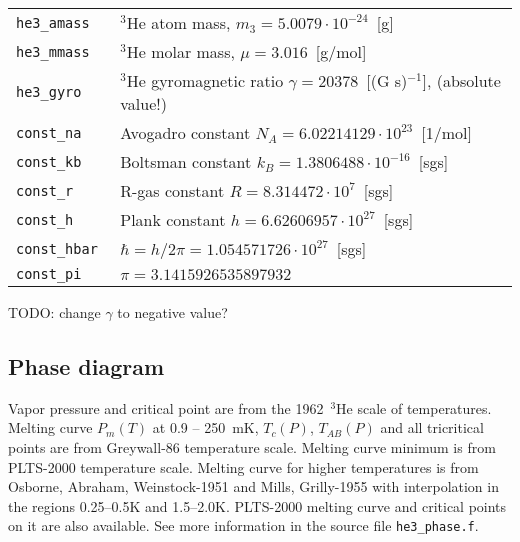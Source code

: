 \documentclass[a4paper]{article}
\begin{document}
\medskip
\noindent\begin{tabular}{lp{11cm}}
\tt he3\_amass     & $^3$He atom mass, $m_3 = 5.0079 \cdot 10^{-24}$~[g]\\
\tt he3\_mmass     & $^3$He molar mass, $\mu = 3.016$~[g/mol]\\
\tt he3\_gyro      & $^3$He gyromagnetic ratio $\gamma = 20378$~[(G s)$^{-1}$],\newline
                     (absolute value!)\\
\tt const\_na      & Avogadro constant $N_A = 6.02214129 \cdot 10^{23}$~[1/mol]\\
\tt const\_kb      & Boltsman constant $k_B = 1.3806488 \cdot 10^{-16}$~[sgs]\\
\tt const\_r       & R-gas constant $R = 8.314472 \cdot 10^{7}$~[sgs]\\
\tt const\_h       & Plank constant $h = 6.62606957 \cdot 10^{27}$~[sgs]\\
\tt const\_hbar    & $\hbar = h/2\pi = 1.054571726 \cdot 10^{27}$~[sgs]\\
\tt const\_pi      & $\pi = 3.1415926535897932$\\
\end{tabular}
\medskip

\noindent TODO: change $\gamma$ to negative value?

\eject
\subsection*{Phase diagram}

Vapor pressure and critical point are from the {1962~$^3$He scale of
temperatures}. Melting curve $P_m(T)$ at 0.9 -- 250~mK, $T_c(P)$,
$T_{AB}(P)$ and all tricritical points are from {Greywall-86 temperature
scale}. Melting curve minimum is from PLTS-2000 temperature scale.
Melting curve for higher temperatures is from {Osborne, Abraham, Weinstock-1951} and {Mills, Grilly-1955} with
interpolation in the regions 0.25--0.5K and 1.5--2.0K. PLTS-2000 melting
curve and critical points on it are also available. See more information
in the source file {\tt he3\_phase.f}.
\end{document}
